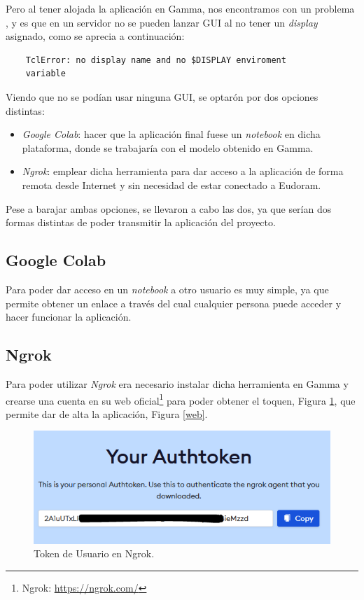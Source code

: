 Pero al tener alojada la aplicación en Gamma, nos encontramos con un problema , y es que en un servidor no se pueden lanzar GUI al no tener un \emph{display} asignado, como se aprecia a continuación: 

\begin{verbatim}
    TclError: no display name and no $DISPLAY enviroment
    variable
\end{verbatim}

Viendo que no se podían usar ninguna GUI, se optarón por dos opciones distintas:
\begin{itemize}
    \item  \emph{Google Colab}: hacer que la aplicación final fuese un \emph{notebook} en dicha plataforma, donde se trabajaría con el modelo obtenido en Gamma.
    \item  \emph{Ngrok}: emplear dicha herramienta para dar acceso a la aplicación de forma remota desde Internet y sin necesidad de estar conectado a Eudoram.
\end{itemize}

Pese a barajar ambas opciones, se llevaron a cabo las dos, ya que serían dos formas distintas de poder transmitir la aplicación del proyecto.

\subsection{Google Colab}
Para poder dar acceso en un \emph{notebook} a otro usuario es muy simple, ya que permite obtener un enlace a través del cual cualquier persona puede acceder y hacer funcionar la aplicación. 

\subsection{Ngrok}
Para poder utilizar \emph{Ngrok} era necesario instalar dicha herramienta en Gamma y crearse una cuenta en su web oficial\footnote{Ngrok: \url{https://ngrok.com/}} para poder obtener el toquen, Figura \ref{token}, que permite dar de alta la aplicación, Figura \ref{web}.

\begin{figure}[h]
    \centering
    \includegraphics[scale=0.6]{./img/Token.png}
    \caption{Token de Usuario en Ngrok.}
    \label{token}
\end{figure}

